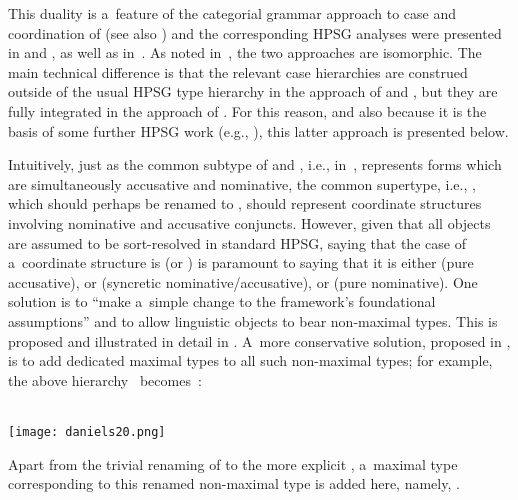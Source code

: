 \documentclass[output=paper]{langsci/langscibook}
\begin{document}
This duality is a~feature of the categorial grammar approach to case and coordination of \citealt{Bayer96} (see also \citealt{BJ95}) and the corresponding HPSG analyses were presented in \citealt{levy:01} and \citealt{lev:pol:01}, as well as in~\citealt{dani:01}.  As noted in~\citealt[233]{lev:pol:01}, the two approaches are isomorphic.  The main technical difference is that the relevant case hierarchies are construed outside of the usual HPSG type hierarchy in the approach of \citealt{levy:01} and \citealt{lev:pol:01}, but they are fully integrated in the approach of \citealt{dani:01}.  For this reason, and also because it is the basis of some further HPSG work (e.g., \citealt{Crysmann2005c}), this latter approach is presented below.

Intuitively, just as the common subtype of  and , i.e.,  in~, represents forms which are simultaneously accusative and nominative, the common supertype, i.e., , which should perhaps be renamed to , should represent coordinate structures involving nominative and accusative conjuncts.  However, given that all objects are assumed to be sort-resolved in standard HPSG, saying that the case of a~coordinate structure is  (or ) is paramount to saying that it is either  (pure accusative), or  (syncretic nominative/accusative), or  (pure nominative).  One solution is to “make a~simple change to the framework's foundational assumptions” \citep[268]{sag:02} and to allow linguistic objects to bear non-maximal types.  This is proposed and illustrated in detail in \citealt{sag:02}.  A~more conservative solution, proposed in \citealt{dani:01}, is to add dedicated maximal types to all such non-maximal types; for example, the above hierarchy~ becomes~:
\begin{examples}
\item\label{daniels20} \mbox{}\\\texttt{[image: daniels20.png]}
\end{examples}
Apart from the trivial renaming of  to the more explicit , a~maximal type corresponding to this renamed non-maximal type is added here, namely, .
\end{document}
